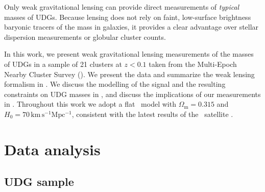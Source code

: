 \documentclass[usenatbib,fleqn]{mnras}
\begin{document}
Only weak gravitational lensing can provide direct measurements of \emph{typical} masses of UDGs. Because lensing does not rely on faint, low-surface brightness baryonic tracers of the mass in galaxies, it provides a clear advantage over stellar dispersion measurements or globular cluster counts. 

In this work, we present weak gravitational lensing measurements of the masses of UDGs in a sample of 21 clusters at $z<0.1$ taken from the Multi-Epoch Nearby Cluster Survey (\meneacs). We present the data and summarize the weak lensing formalism in . We discuss the modelling of the signal and the resulting constraints on UDG masses in , and discuss the implications of our measurements in . Throughout this work we adopt a flat \lcdm\ model with $\Omega_\mathrm{m}=0.315$ and $H_0=70\,\mathrm{km\,s^{-1}Mpc^{-1}}$, consistent with the latest results of the \planck\ satellite \citep{planck15xiii}.

\section{Data analysis}
\label{s:data}


\subsection{UDG sample}
\end{document}
